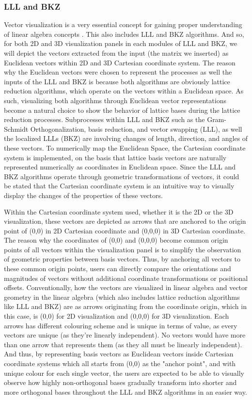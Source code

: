\subsubsection{LLL and BKZ}
Vector visualization is a very essential concept for gaining proper understanding of linear algebra concepts \cite{15}. This also includes LLL and BKZ algorithms. And so, for both 2D and 3D visualization panels in each modules of LLL and BKZ, we will depict the vectors extracted from the input (the matrix we inserted) as Euclidean vectors within 2D and 3D Cartesian coordinate system. The reason why the Euclidean vectors were chosen to represent the processes as well the inputs of the LLL and BKZ is because both algorithms are obviously lattice reduction algorithms, which operate on the vectors within a Euclidean space. As such, visualizing both algorithms through Euclidean vector representations become a natural choice to show the behavior of lattice bases during the lattice reduction processes. Subprocesses within LLL and BKZ such as the Gram-Schmidt Orthogonalization, basis reduction, and vector swapping (LLL), as well the localized LLLs (BKZ) are involving changes of length, direction, and angles of these vectors. To numerically map the Euclidean Space, the Cartesian coordinate system is implemented, on the basis that lattice basis vectors are naturally represented numerically as coordinates in Euclidean space. Since the LLL and BKZ algorithms operate through geometric transformations of vectors, it could be stated that the Cartesian coordinate system is an intuitive way to visually display the changes of the properties of these vectors. 

Within the Cartesian coordinate system used, whether it is the 2D or the 3D visualization, these vectors are depicted as arrows that are anchored to the origin point of (0,0) in 2D Cartesian coordinate and (0,0,0) in 3D Cartesian coordinate. The reason why the coordinates of (0,0) and (0,0,0) become common origin points of all vectors within the visualization panel is to simplify the observation of geometric properties between basis vectors. Thus, by anchoring all vectors to these common origin points, users can directly compare the orientations and magnitudes of vectors without additional coordinate transformations or positional offsets. Conventionally, how the vectors are visualized in linear algebra and vector geometry in the linear algebra (which also includes lattice reduction algorithms like LLL and BKZ) are as arrows originating from the coordinate origin, which in this case, is (0,0) for 2D visualization and (0,0,0) for 3D visualization. Each arrows has different colouring scheme and is unique in terms of value, as every vectors are unique (as they're linearly independent). No vectors would have more than one arrow that represents them (as they all must be linearly independent). And thus, by representing basis vectors as Euclidean vectors inside Cartesian coordinate systems which all starts from (0,0) as the "anchor point", and with unique colour for each single vector, the users are expected to be able to visually observe how highly non-orthogonal bases gradually transform into shorter and more orthogonal bases throughout the LLL and BKZ algorithms in an easier way. 

